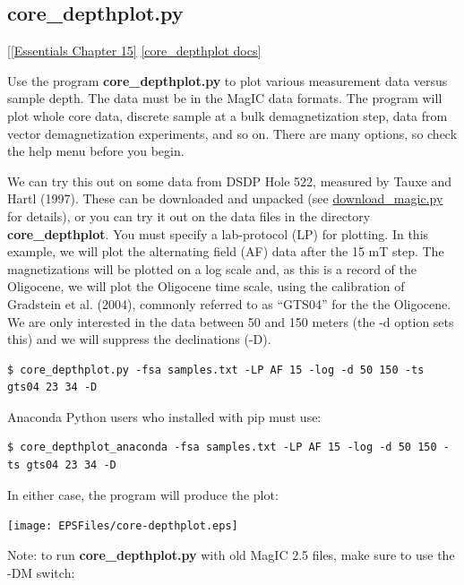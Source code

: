 \documentclass[11pt]{book}
\begin{document}
{{{
\subsection{core\_depthplot.py} [\href{http://earthref.org/MAGIC/books/Tauxe/Essentials/WebBook3ch15.html#ch15}{[Essentials Chapter 15]}
\href{https://github.com/PmagPy/PmagPy/blob/master/programs/core_depthplot.py}{[core\_depthplot docs]}

Use the program {\bf core\_depthplot.py} to plot various measurement data versus sample depth.   The data must be in the MagIC data formats.  The program will plot whole core data, discrete sample at a bulk demagnetization step, data from vector demagnetization experiments, and so on.  There are many options, so check the help menu before you begin.

We can try this out on some data from DSDP Hole 522, measured by Tauxe and Hartl (1997).  \nocite{tauxe97}  These can be downloaded and unpacked (see \href{#download_magic.py}{download\_magic.py} for details),  or you can try it out on the data files in the directory {\bf core\_depthplot}.   You must specify a lab-protocol (LP) for plotting.  In this example, we will plot the alternating field (AF) data after the 15 mT step.  The magnetizations will be plotted on a log scale and, as this is a record of the Oligocene, we will plot the Oligocene time scale, using the calibration of Gradstein et al. (2004),  \nocite{gradstein04} commonly referred to as ``GTS04'' for the the Oligocene.  We are only interested in the data between 50 and 150 meters (the -d option sets this) and we will suppress the declinations (-D).

\begin{verbatim}
$ core_depthplot.py -fsa samples.txt -LP AF 15 -log -d 50 150 -ts gts04 23 34 -D
\end{verbatim}

Anaconda Python users who installed with pip must use:

\begin{verbatim}
$ core_depthplot_anaconda -fsa samples.txt -LP AF 15 -log -d 50 150 -ts gts04 23 34 -D
\end{verbatim}


\noindent  In either case, the program will produce the plot:

\texttt{[image: EPSFiles/core-depthplot.eps]}

Note: to run {\bf core\_depthplot.py} with old MagIC 2.5 files, make sure to use the -DM switch:

}}}
\end{document}
